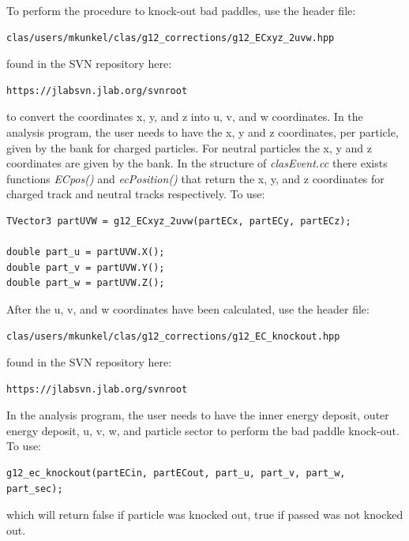 To perform the procedure to knock-out bad  paddles, use the header file:
\begin{verbatim}
clas/users/mkunkel/clas/g12_corrections/g12_ECxyz_2uvw.hpp
\end{verbatim}
found in the SVN repository here:
\begin{verbatim}
https://jlabsvn.jlab.org/svnroot
\end{verbatim}
to convert the  coordinates x, y, and z into u, v, and w  coordinates. In the analysis program, the user needs to have the  x, y and z coordinates, per particle, given by the  bank for charged particles. For neutral particles the  x, y and z coordinates are given by the  bank. In the structure of \emph{clasEvent.cc} there exists functions \emph{ECpos()} and \emph{ ecPosition()} that return the  x, y, and z coordinates for charged track and neutral tracks respectively. To use:
\begin{verbatim}
TVector3 partUVW = g12_ECxyz_2uvw(partECx, partECy, partECz);

double part_u = partUVW.X();
double part_v = partUVW.Y();
double part_w = partUVW.Z();
\end{verbatim}
After the  u, v, and w coordinates have been calculated, use the header file:
\begin{verbatim}
clas/users/mkunkel/clas/g12_corrections/g12_EC_knockout.hpp
\end{verbatim}
found in the SVN repository here:
\begin{verbatim}
https://jlabsvn.jlab.org/svnroot
\end{verbatim}
In the analysis program, the user needs to have the  inner energy deposit,  outer energy deposit, u, v, w, and particle sector to perform the  bad paddle knock-out. To use:
\begin{verbatim}
g12_ec_knockout(partECin, partECout, part_u, part_v, part_w, part_sec);
\end{verbatim}
which will return false if particle was knocked out, true if passed was not knocked out.

\FloatBarrier
